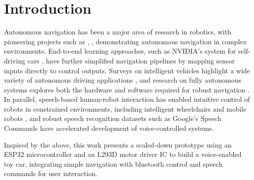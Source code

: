 \documentclass[conference]{IEEEtran}
\begin{document}
\section{Introduction}
Autonomous navigation has been a major area of research in robotics, with pioneering projects such as 
\cite{thrun2006stanley}, 
\cite{urmson2008boss, montemerlo2008junior}, demonstrating autonomous navigation in complex environments. End-to-end learning approaches, such as NVIDIA's system for self-driving cars \cite{bojarski2016end}, have further simplified navigation pipelines by mapping sensor inputs directly to control outputs. Surveys on intelligent vehicles highlight a wide variety of autonomous driving applications \cite{bishop2000survey}, and research on fully autonomous systems explores both the hardware and software required for robust navigation \cite{levinson2011towards}. In parallel, speech-based human-robot interaction has enabled intuitive control of robots in constrained environments, including intelligent wheelchairs and mobile robots \cite{li2017speech, prasad2013voice, vasudevan2010speech}, and robust speech recognition datasets such as Google’s Speech Commands \cite{warden2018speech} have accelerated development of voice-controlled systems. 

Inspired by the above,  this work presents a scaled-down prototype using an ESP32 microcontroller and an L293D motor driver IC to build a voice-enabled toy car, integrating simple navigation with bluetooth control and speech commands for user interaction.

\end{document}
